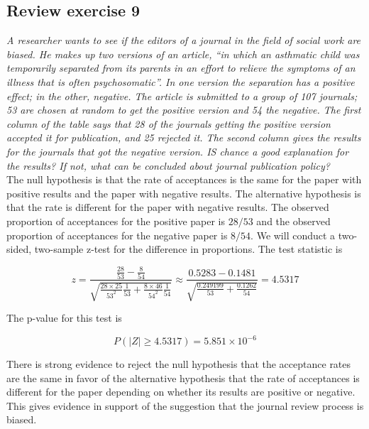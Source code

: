 \documentclass[11pt]{article}
\newcommand{\pr}{P} %
\begin{document}

\subsection*{Review exercise 9} %
\textit{A researcher wants to see if the editors of a journal in the field of social work are biased. He makes up two versions of an article, ``in which an asthmatic child was temporarily separated from its parents in an effort to relieve the symptoms of an illness that is often psychosomatic''. In one version the separation has a positive effect; in the other, negative. The article is submitted to a group of 107 journals; 53 are chosen at random to get the positive version and 54 the negative. The first column of the table says that 28 of the journals getting the positive version accepted it for publication, and 25 rejected it. The second column gives the results for the journals that got the negative version. IS chance a good explanation for the results? If not, what can be concluded about journal publication policy?}\\

The null hypothesis is that the rate of acceptances is the same for the paper with positive results and the paper with negative results.  The alternative hypothesis is that the rate is different for the paper with negative results.  The observed proportion of acceptances for the positive paper is $28/53$ and the observed proportion of acceptances for the negative paper is $8/54$. We will conduct a two-sided, two-sample z-test for the difference in proportions.  The test statistic is

$$z = \frac{\frac{28}{53} - \frac{8}{54}}{\sqrt{ \frac{28\times25}{53^2}\frac{1}{53} + \frac{8\times46}{54^2}\frac{1}{54}}} \approx \frac{ 0.5283 - 0.1481}{\sqrt{ \frac{ 0.249199}{53} + \frac{ 0.1262}{54}}} = 4.5317$$

The p-value for this test is

$$\pr(\lvert Z\rvert \geq 4.5317) = 5.851 \times 10^{-6}$$

There is strong evidence to reject the null hypothesis that the acceptance rates are the same in favor of the alternative hypothesis that the rate of acceptances is different for the paper depending on whether its results are positive or negative.  This gives evidence in support of the suggestion that the journal review process is biased.
\end{document}
